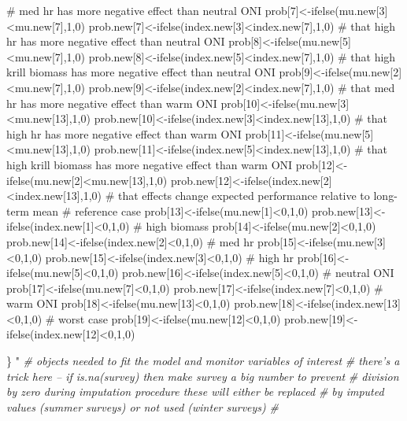 \documentclass[]{elsarticle} %
\newenvironment{Shaded}{\begin{snugshade}}{\end{snugshade}}
\newcommand{\CommentTok}[1]{\textcolor[rgb]{0.56,0.35,0.01}{\textit{#1}}}
\newcommand{\StringTok}[1]{\textcolor[rgb]{0.31,0.60,0.02}{#1}}
\begin{document}
\begin{Shaded}
\begin{Highlighting}[numbers=left,,]
{{\StringTok{    # med hr has more negative effect than neutral ONI}
\StringTok{    prob[7]<-ifelse(mu.new[3]<mu.new[7],1,0)}
\StringTok{    prob.new[7]<-ifelse(index.new[3]<index.new[7],1,0)}
\StringTok{    # that high hr has more negative effect than neutral ONI}
\StringTok{    prob[8]<-ifelse(mu.new[5]<mu.new[7],1,0)}
\StringTok{    prob.new[8]<-ifelse(index.new[5]<index.new[7],1,0)}
\StringTok{    # that high krill biomass has more negative effect than neutral ONI}
\StringTok{    prob[9]<-ifelse(mu.new[2]<mu.new[7],1,0)}
\StringTok{    prob.new[9]<-ifelse(index.new[2]<index.new[7],1,0)}
\StringTok{    # that med hr has more negative effect than warm ONI}
\StringTok{    prob[10]<-ifelse(mu.new[3]<mu.new[13],1,0)}
\StringTok{    prob.new[10]<-ifelse(index.new[3]<index.new[13],1,0)}
\StringTok{    # that high hr has more negative effect than warm ONI}
\StringTok{    prob[11]<-ifelse(mu.new[5]<mu.new[13],1,0)}
\StringTok{    prob.new[11]<-ifelse(index.new[5]<index.new[13],1,0)}
\StringTok{    # that high krill biomass has more negative effect than warm ONI}
\StringTok{    prob[12]<-ifelse(mu.new[2]<mu.new[13],1,0)}
\StringTok{    prob.new[12]<-ifelse(index.new[2]<index.new[13],1,0)}
\StringTok{    }
\StringTok{    }
\StringTok{    # that effects change expected performance relative to long-term mean}
\StringTok{    # reference case}
\StringTok{    prob[13]<-ifelse(mu.new[1]<0,1,0)}
\StringTok{    prob.new[13]<-ifelse(index.new[1]<0,1,0)}
\StringTok{    # high biomass}
\StringTok{    prob[14]<-ifelse(mu.new[2]<0,1,0)}
\StringTok{    prob.new[14]<-ifelse(index.new[2]<0,1,0)}
\StringTok{    # med hr}
\StringTok{    prob[15]<-ifelse(mu.new[3]<0,1,0)}
\StringTok{    prob.new[15]<-ifelse(index.new[3]<0,1,0)}
\StringTok{    # high hr}
\StringTok{    prob[16]<-ifelse(mu.new[5]<0,1,0)}
\StringTok{    prob.new[16]<-ifelse(index.new[5]<0,1,0)}
\StringTok{    # neutral ONI}
\StringTok{    prob[17]<-ifelse(mu.new[7]<0,1,0)}
\StringTok{    prob.new[17]<-ifelse(index.new[7]<0,1,0)}
\StringTok{    # warm ONI}
\StringTok{    prob[18]<-ifelse(mu.new[13]<0,1,0)}
\StringTok{    prob.new[18]<-ifelse(index.new[13]<0,1,0)}
\StringTok{    # worst case}
\StringTok{    prob[19]<-ifelse(mu.new[12]<0,1,0)}
\StringTok{    prob.new[19]<-ifelse(index.new[12]<0,1,0)}

\StringTok{  \}}
\StringTok{"}
\CommentTok{# objects needed to fit the model and monitor variables of interest}
\CommentTok{# there's a trick here -- if is.na(survey) then make survey a big number to prevent}
\CommentTok{# division by zero during imputation procedure these will either be replaced}
\CommentTok{# by imputed values (summer surveys) or not used (winter surveys)}
\CommentTok{#}

}}
\end{Highlighting}
\end{Shaded}
\end{document}
